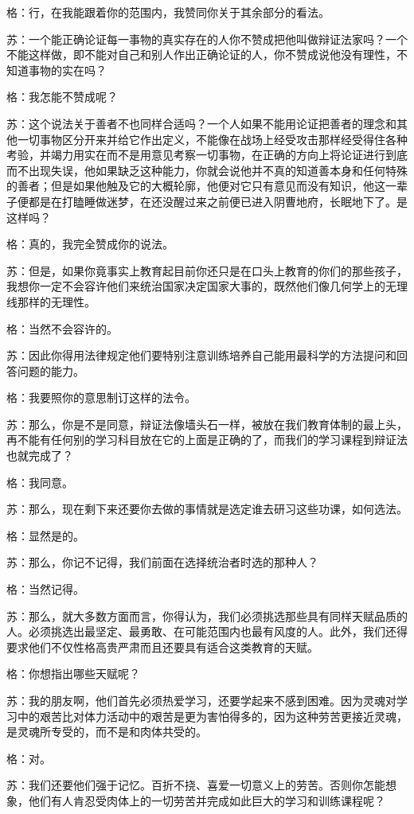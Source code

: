 \documentclass[12pt,oneside]{book}
\begin{document}
格：行，在我能跟着你的范围内，我赞同你关于其余部分的看法。

苏：一个能正确论证每一事物的真实存在的人你不赞成把他叫做辩证法家吗？一个不能这样做，即不能对自己和别人作出正确论证的人，你不赞成说他没有理性，不知道事物的实在吗？

格：我怎能不赞成呢？

苏：这个说法关于善者不也同样合适吗？一个人如果不能用论证把善者的理念和其他一切事物区分开来并给它作出定义，不能像在战场上经受攻击那样经受得住各种考验，并竭力用实在而不是用意见考察一切事物，在正确的方向上将论证进行到底而不出现失误，他如果缺乏这种能力，你就会说他并不真的知道善本身和任何特殊的善者；但是如果他触及它的大概轮廓，他便对它只有意见而没有知识，他这一辈子便都是在打瞌睡做迷梦，在还没醒过来之前便已进入阴曹地府，长眠地下了。是这样吗？

格：真的，我完全赞成你的说法。

苏：但是，如果你竟事实上教育起目前你还只是在口头上教育的你们的那些孩子，我想你一定不会容许他们来统治国家决定国家大事的，既然他们像几何学上的无理线那样的无理性。

格：当然不会容许的。

苏：因此你得用法律规定他们要特别注意训练培养自己能用最科学的方法提问和回答问题的能力。

格：我要照你的意思制订这样的法令。

苏：那么，你是不是同意，辩证法像墙头石一样，被放在我们教育体制的最上头，再不能有任何别的学习科目放在它的上面是正确的了，而我们的学习课程到辩证法也就完成了？

格：我同意。

苏：那么，现在剩下来还要你去做的事情就是选定谁去研习这些功课，如何选法。

格：显然是的。

苏：那么，你记不记得，我们前面在选择统治者时选的那种人？

格：当然记得。

苏：那么，就大多数方面而言，你得认为，我们必须挑选那些具有同样天赋品质的人。必须挑选出最坚定、最勇敢、在可能范围内也最有风度的人。此外，我们还得要求他们不仅性格高贵严肃而且还要具有适合这类教育的天赋。

格：你想指出哪些天赋呢？

苏：我的朋友啊，他们首先必须热爱学习，还要学起来不感到困难。因为灵魂对学习中的艰苦比对体力活动中的艰苦是更为害怕得多的，因为这种劳苦更接近灵魂，是灵魂所专受的，而不是和肉体共受的。

格：对。

苏：我们还要他们强于记忆。百折不挠、喜爱一切意义上的劳苦。否则你怎能想象，他们有人肯忍受肉体上的一切劳苦并完成如此巨大的学习和训练课程呢？
\end{document}
